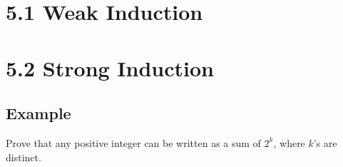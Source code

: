 \documentclass{article}
\begin{document}
\newcommand{\hr}{\par\noindent\rule{\textwidth}{0.4pt}}

\newcommand{\bc}[1]{
	\begin{equation*}
		\begin{boxed}
			{#1}
		\end{boxed}
	\end{equation*}
}

\newcommand{\cond}[2]{
	\ifmmode
	{#1} \quad {#2}
	\else
	$$ {#1} \quad {#2} $$
	\fi
}

\newcommand{\matr}[1]{
	\ifmmode \bm{#1}
	\else \textit{\textbf{#1}}
	\fi
}
\newcommand{\vect}[1]{
	\ifmmode \mathbf{#1}
	\else \textbf{#1}
	\fi
}


\tableofcontents

\section{5.1 Weak Induction}

\section{5.2 Strong Induction}

\subsection{Example}

Prove that any positive integer can be written as a sum of $ 2^k $, where $ k $'s are distinct.
\end{document}
